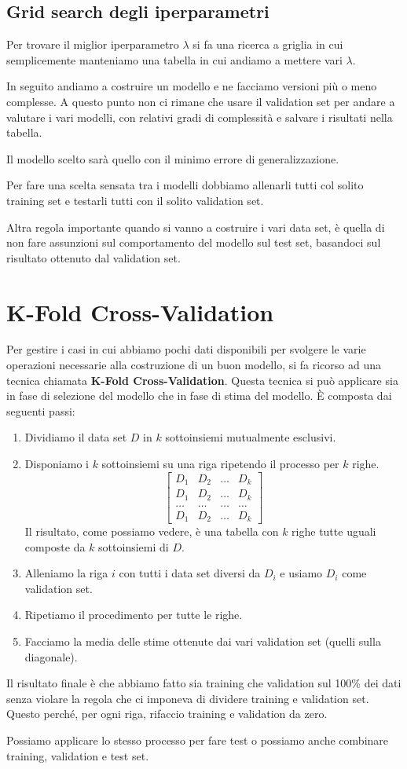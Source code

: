 \subsection{Grid search degli iperparametri}
Per trovare il miglior iperparametro $\lambda$ si fa una ricerca a griglia in cui semplicemente manteniamo una tabella
in cui andiamo a mettere vari $\lambda$.

In seguito andiamo a costruire un modello e ne facciamo versioni pi\`u o meno complesse. A questo punto non ci rimane che
usare il validation set per andare a valutare i vari modelli, con relativi gradi di complessit\`a e salvare i risultati
nella tabella.

Il modello scelto sar\`a quello con il minimo errore di generalizzazione.

Per fare una scelta sensata tra i modelli dobbiamo allenarli tutti col solito training set e testarli tutti con il solito
validation set.

Altra regola importante quando si vanno a costruire i vari data set, \`e quella di non fare assunzioni sul comportamento
del modello sul test set, basandoci sul risultato ottenuto dal validation set.

\section{K-Fold Cross-Validation}
Per gestire i casi in cui abbiamo pochi dati disponibili per svolgere le varie operazioni necessarie alla costruzione di
un buon modello, si fa ricorso ad una tecnica chiamata \textbf{K-Fold Cross-Validation}. Questa tecnica si pu\`o applicare
sia in fase di selezione del modello che in fase di stima del modello. \`E composta dai seguenti passi:
\begin{enumerate}
	\item Dividiamo il data set $D$ in $k$ sottoinsiemi mutualmente esclusivi.
	\item Disponiamo i $k$ sottoinsiemi su una riga ripetendo il processo per $k$ righe.
	      \[
		      \begin{bmatrix}
			      D_1   & D_2   & \dots & D_k   \\
			      D_1   & D_2   & \dots & D_k   \\
			      \dots & \dots & \dots & \dots \\
			      D_1   & D_2   & \dots & D_k
		      \end{bmatrix}
	      \]
	      Il risultato, come possiamo vedere, \`e una tabella con $k$ righe tutte uguali composte da $k$ sottoinsiemi
	      di $D$.
	\item Alleniamo la riga $i$ con tutti i data set diversi da $D_i$ e usiamo $D_i$ come validation set.
	\item Ripetiamo il procedimento per tutte le righe.
	\item Facciamo la media delle stime ottenute dai vari validation set (quelli sulla diagonale).
\end{enumerate}
Il risultato finale \`e che abbiamo fatto sia training che validation sul 100\% dei dati senza violare la regola che ci
imponeva di dividere training e validation set. Questo perch\'e, per ogni riga, rifaccio training e validation da zero.

Possiamo applicare lo stesso processo per fare test o possiamo anche combinare training, validation e test set.
